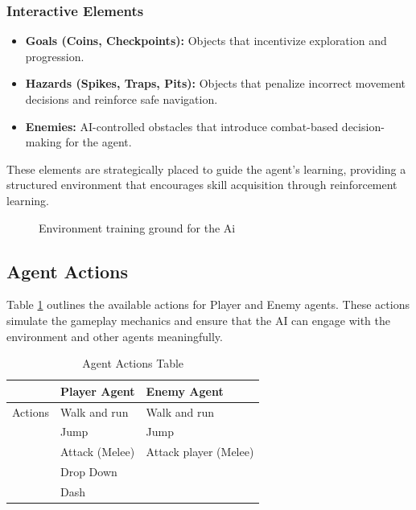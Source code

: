 \documentclass[12pt,oneside,openright,a4paper]{cpe-english-project}
\begin{document}
\subsubsection{Interactive Elements}
\begin{itemize}
\item  \textbf{Goals (Coins, Checkpoints):} Objects that incentivize exploration and progression.
\item  \textbf{Hazards (Spikes, Traps, Pits):} Objects that penalize incorrect movement decisions and reinforce safe navigation.
\item  \textbf{Enemies:} AI-controlled obstacles that introduce combat-based decision-making for the agent.
\end{itemize}
These elements are strategically placed to guide the agent’s learning, providing a structured environment that encourages skill acquisition through reinforcement learning.
\begin{figure}[!h]
\centering
{}
\caption{Environment training ground for the Ai}\label{fig:EnvironmentDesign}
\end{figure}
\subsection{Agent Actions}
Table \ref{tbl:Agent Actions Table} outlines the available actions for Player and Enemy agents. These actions simulate the gameplay mechanics and ensure that the AI can engage with the environment and other agents meaningfully.
\begin{table}[!h]
\caption{Agent Actions Table}\label{tbl:Agent Actions Table}
\begin{tabular}{|l|l|l|} \hline
& \textbf{Player Agent} & \textbf{Enemy Agent} \\ \hline
Actions & Walk and run & Walk and run \\ 
& Jump & Jump \\ 
& Attack (Melee) & Attack player (Melee)  \\ 
& Drop Down &  \\
& Dash &  \\ \hline
\end{tabular}
\end{table}
\end{document}
